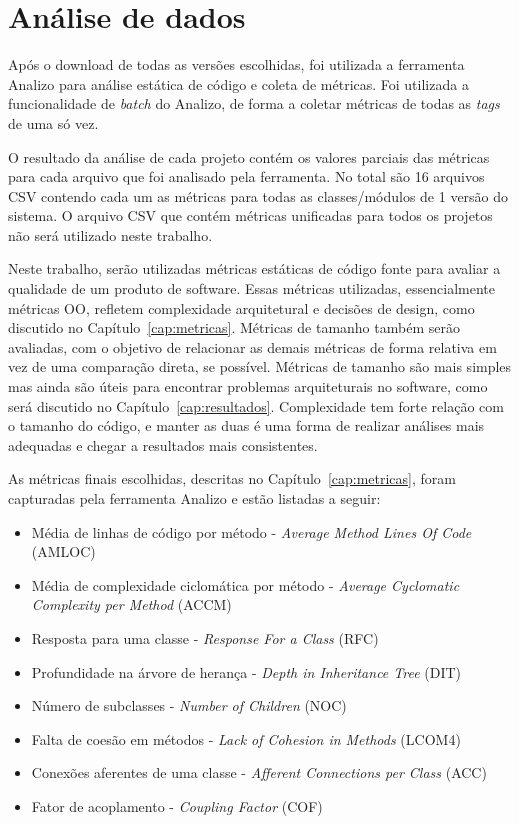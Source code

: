 \section{Análise de dados}

Após o download de todas as versões escolhidas, foi utilizada a ferramenta Analizo para análise estática de código e coleta de métricas. Foi utilizada a funcionalidade de \textit{batch} do Analizo, de forma a coletar métricas de todas as \textit{tags} de uma só vez. 

O resultado da análise de cada projeto contém os valores parciais das métricas para cada arquivo que foi analisado pela ferramenta. No total são 16 arquivos CSV contendo cada um as métricas para todas as classes/módulos de 1 versão do sistema. O arquivo CSV que contém métricas unificadas para todos os projetos não será utilizado neste trabalho. 

Neste trabalho, serão utilizadas métricas estáticas de código fonte para avaliar a qualidade de um produto de software. Essas métricas utilizadas, essencialmente métricas OO, refletem complexidade arquitetural e decisões de design, como discutido no Capítulo~\ref{cap:metricas}. Métricas de tamanho também serão avaliadas, com o objetivo de relacionar as demais métricas de forma relativa em vez de uma comparação direta, se possível. Métricas de tamanho são mais simples mas ainda são úteis para encontrar problemas arquiteturais no software, como será discutido no Capítulo~\ref{cap:resultados}. Complexidade tem forte relação com o tamanho do código, e manter as duas é uma forma de realizar análises mais adequadas e chegar a resultados mais consistentes.

As métricas finais escolhidas, descritas no Capítulo~\ref{cap:metricas}, foram capturadas pela ferramenta Analizo e estão listadas a seguir:

\begin{itemize}
\item Média de linhas de código por método - \textit{Average Method Lines Of Code} (AMLOC)
\item Média de complexidade ciclomática por método - \textit{Average Cyclomatic Complexity per Method} (ACCM)
\item Resposta para uma classe - \textit{Response For a Class} (RFC)
\item Profundidade na árvore de herança - \textit{Depth in Inheritance Tree} (DIT)
\item Número de subclasses - \textit{Number of Children} (NOC)
\item Falta de coesão em métodos - \textit{Lack of Cohesion in Methods} (LCOM4)
\item Conexões aferentes de uma classe - \textit{Afferent Connections per Class} (ACC)
\item Fator de acoplamento - \textit{Coupling Factor} (COF)
\end{itemize}

